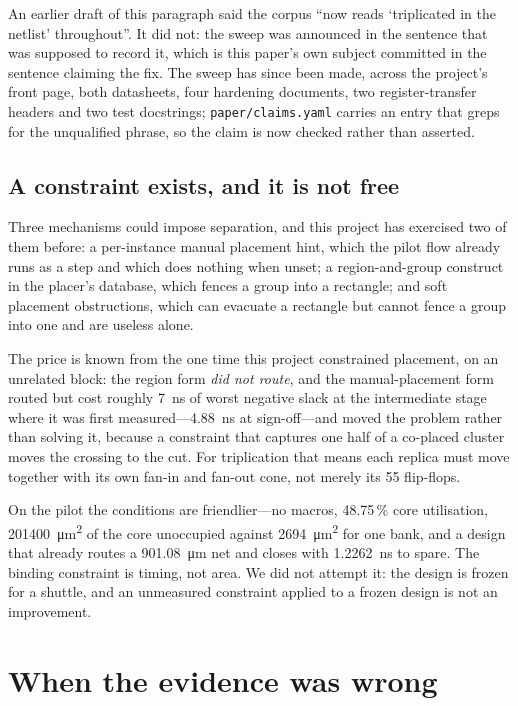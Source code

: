 \documentclass[11pt,a4paper]{article}
\newcommand{\file}[1]{\texttt{\small #1}}
\begin{document}
An earlier draft of this paragraph said the corpus ``now reads
`triplicated in the netlist' throughout''. It did not: the sweep was
announced in the sentence that was supposed to record it, which is this
paper's own subject committed in the sentence claiming the fix. The
sweep has since been made, across the project's front page, both
datasheets, four hardening documents, two register-transfer headers and
two test docstrings; \file{paper/claims.yaml} carries an entry that
greps for the unqualified phrase, so the claim is now checked rather
than asserted.

\subsection{A constraint exists, and it is not free}

Three mechanisms could impose separation, and this project has exercised
two of them before: a per-instance manual placement hint, which the
pilot flow already runs as a step and which does nothing when unset; a
region-and-group construct in the placer's database, which fences a group
into a rectangle; and soft placement obstructions, which can evacuate a
rectangle but cannot fence a group into one and are useless alone.

The price is known from the one time this project constrained placement,
on an unrelated block: the region form \emph{did not route}, and the
manual-placement form routed but cost roughly \SI{7}{\nano\second} of
worst negative slack at the intermediate stage where it was first
measured---\SI{4.88}{\nano\second} at sign-off---and moved the problem
rather than solving it,
because a constraint that captures one half of a co-placed cluster moves
the crossing to the cut. For triplication that means each replica must
move together with its own fan-in and fan-out cone, not merely its 55
flip-flops.

On the pilot the conditions are friendlier---no macros, 48.75\,\% core
utilisation, \SI{201400}{\micro\meter\squared} of the core unoccupied
against \SI{2694}{\micro\meter\squared} for one bank, and a design that
already routes a \SI{901.08}{\micro\meter} net and closes with
\SI{1.2262}{\nano\second} to spare. The binding constraint is timing, not
area. We did not attempt it: the design is frozen for a shuttle, and an
unmeasured constraint applied to a frozen design is not an improvement.

\section{When the evidence was wrong}
\label{sec:evidence}
\end{document}
